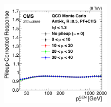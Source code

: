 \begin{frame}
{\begin{textblock}{.9}
\begin{figure}
				\includegraphics[width=0.48\textwidth]{images/Can1_noPreliminary.pdf} %
			\end{figure}
		\end{textblock}
	}
\end{frame}
